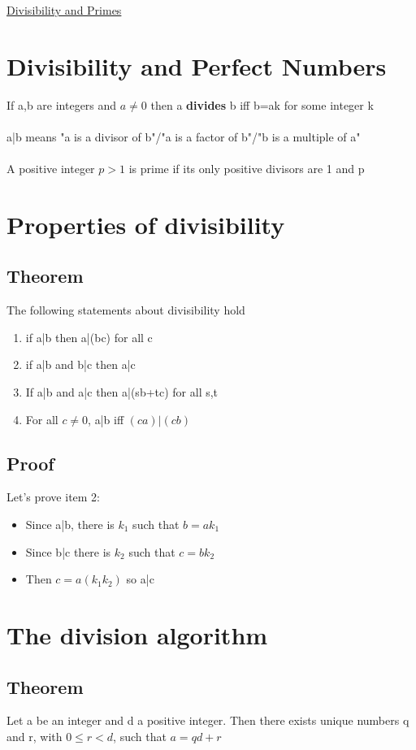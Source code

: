 \documentclass{article}[18pt]
\begin{document}
\begin{center}
\underline{\huge Divisibility and Primes}
\end{center}
\section{Divisibility and Perfect Numbers}
If a,b are integers and $a\neq 0$ then a \textbf{divides} b iff b=ak for some integer k\\
\\
a|b means "a is a divisor of b"/"a is a factor of b"/"b is a multiple of a"\\
\\
A positive integer $p>1$ is prime if its only positive divisors are 1 and p
\section{Properties of divisibility}
\subsection{Theorem}
The following statements about divisibility hold
\begin{enumerate}
	\item if a|b then a|(bc) for all c
	\item if a|b and b|c then a|c
	\item If a|b and a|c then a|(sb+tc) for all s,t
	\item For all $c\neq 0$, a|b iff $(ca)|(cb)$
\end{enumerate}
\subsection{Proof}
Let's prove item 2:
\begin{itemize}
	\item Since a|b, there is $k_1$ such that $b=ak_1$
	\item Since b|c there is $k_2$ such that $c=bk_2$
	\item Then $c=a(k_1k_2)$ so a|c
\end{itemize}
\section{The division algorithm}
\subsection{Theorem}
Let a be an integer and d a positive integer. Then there exists unique numbers q and r, with $0\leqslant r<d$, such that $a=qd+r$
\end{document}

